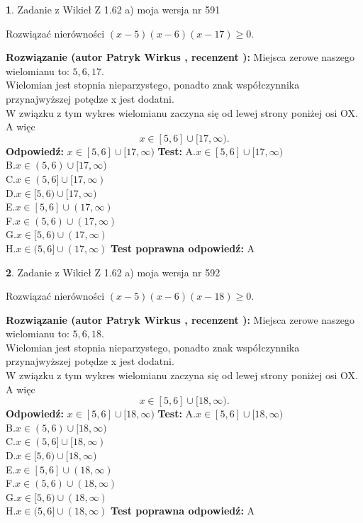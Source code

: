\documentclass[12pt, a4paper]{article}
\theoremstyle{definition} %
\newtheorem{zad}{}
\newcommand{\zadStart}[1]{\begin{zad}#1\newline}
\newcommand{\zadStop}{\end{zad}}
\newcommand{\rozwStart}[2]{\noindent \textbf{Rozwiązanie (autor #1 , recenzent #2): }\newline}
\newcommand{\rozwStop}{\newline}
\newcommand{\odpStart}{\noindent \textbf{Odpowiedź:}\newline}
\newcommand{\odpStop}{\newline}
\newcommand{\testStart}{\noindent \textbf{Test:}\newline}
\newcommand{\testStop}{\newline}
\newcommand{\kluczStart}{\noindent \textbf{Test poprawna odpowiedź:}\newline}
\newcommand{\kluczStop}{\newline}
\begin{document}
\zadStart{Zadanie z Wikieł Z 1.62 a) moja wersja nr 591}

Rozwiązać nierówności $(x-5)(x-6)(x-17)\ge0$.
\zadStop
\rozwStart{Patryk Wirkus}{}
Miejsca zerowe naszego wielomianu to: $5, 6, 17$.\\
Wielomian jest stopnia nieparzystego, ponadto znak współczynnika przy\linebreak najwyższej potędze x jest dodatni.\\ W związku z tym wykres wielomianu zaczyna się od lewej strony poniżej osi OX. A więc $$x \in [5,6] \cup [17,\infty).$$
\rozwStop
\odpStart
$x \in [5,6] \cup [17,\infty)$
\odpStop
\testStart
A.$x \in [5,6] \cup [17,\infty)$\\
B.$x \in (5,6) \cup [17,\infty)$\\
C.$x \in (5,6] \cup [17,\infty)$\\
D.$x \in [5,6) \cup [17,\infty)$\\
E.$x \in [5,6] \cup (17,\infty)$\\
F.$x \in (5,6) \cup (17,\infty)$\\
G.$x \in [5,6) \cup (17,\infty)$\\
H.$x \in (5,6] \cup (17,\infty)$
\testStop
\kluczStart
A
\kluczStop



\zadStart{Zadanie z Wikieł Z 1.62 a) moja wersja nr 592}

Rozwiązać nierówności $(x-5)(x-6)(x-18)\ge0$.
\zadStop
\rozwStart{Patryk Wirkus}{}
Miejsca zerowe naszego wielomianu to: $5, 6, 18$.\\
Wielomian jest stopnia nieparzystego, ponadto znak współczynnika przy\linebreak najwyższej potędze x jest dodatni.\\ W związku z tym wykres wielomianu zaczyna się od lewej strony poniżej osi OX. A więc $$x \in [5,6] \cup [18,\infty).$$
\rozwStop
\odpStart
$x \in [5,6] \cup [18,\infty)$
\odpStop
\testStart
A.$x \in [5,6] \cup [18,\infty)$\\
B.$x \in (5,6) \cup [18,\infty)$\\
C.$x \in (5,6] \cup [18,\infty)$\\
D.$x \in [5,6) \cup [18,\infty)$\\
E.$x \in [5,6] \cup (18,\infty)$\\
F.$x \in (5,6) \cup (18,\infty)$\\
G.$x \in [5,6) \cup (18,\infty)$\\
H.$x \in (5,6] \cup (18,\infty)$
\testStop
\kluczStart
A
\kluczStop
\end{document}
